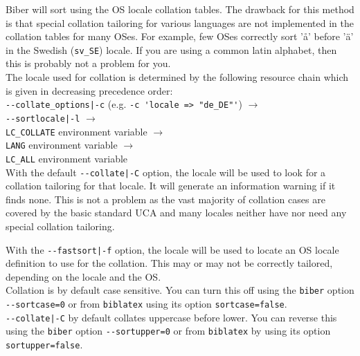 \documentclass{ltxdockit}
\def\biberex#1{\hbox{\hspace{-4em}\texttt{\small \detokenize{#1}}}}
\begin{document}
\biberex{--fastsort|-f}
  \noindent Biber will sort using
  the OS locale collation tables. The drawback for this method is that special
  collation tailoring for various languages are not implemented in the
  collation tables for many OSes. For example, few OSes correctly sort 'å'
  before 'ä' in the Swedish (\verb+sv_SE+) locale. If you are using a
  common latin alphabet, then this is probably not a problem for you.\\[2ex]

\noindent The locale used for collation is determined by the following resource
chain which is given in decreasing precedence order:\\[2ex]

\noindent\verb+--collate_options|-c+ (e.g. \verb+-c 'locale => "de_DE"'+) $\rightarrow$\\
\hspace*{1em}\verb+--sortlocale|-l+ $\rightarrow$\\
\hspace*{2em}\verb+LC_COLLATE+ environment variable $\rightarrow$\\
\hspace*{3em}\verb+LANG+ environment variable $\rightarrow$\\
\hspace*{4em}\verb+LC_ALL+ environment variable\\[2ex]

\noindent With the default \verb+--collate|-C+ option, the locale will
be used to look for a collation tailoring for that locale. It will generate an
information warning if it finds none. This is not a problem as the vast
majority of collation cases are covered by the basic standard UCA and many
locales neither have nor need any special collation tailoring.

With the \verb+--fastsort|-f+ option, the locale will be
used to locate an OS locale definition to use for the collation. This
may or may not be correctly tailored, depending on the locale and the OS.\\[1ex]

\noindent Collation is by default case sensitive. You can turn this
off using the \verb+biber+ option \verb+--sortcase=0+ or from
\verb+biblatex+ using its option \verb+sortcase=false+.\\[1ex]

\noindent\verb+--collate|-C+ by default collates uppercase before
lower. You can reverse this using the \verb+biber+ option \verb+--sortupper=0+
or from \verb+biblatex+ by using its option \verb+sortupper=false+.\\[1ex]
\end{document}
